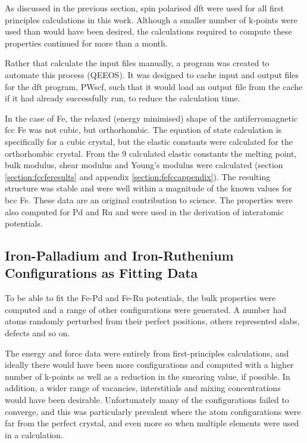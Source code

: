 As discussed in the previous section, spin polarised \acrshort{dft} were used for all first principles calculations in this work.  Although a smaller number of k-points were used than would have been desired, the calculations required to compute these properties continued for more than a month.

Rather that calculate the input files manually, a program was created to automate this process (QEEOS).  It was designed to cache input and output files for the \acrshort{dft} program, PWscf, such that it would load an output file from the cache if it had already successfully run, to reduce the calculation time.

In the case of Fe, the relaxed (energy minimised) shape of the antiferromagnetic \acrshort{fcc} Fe was not cubic, but orthorhombic.  The equation of state calculation is specifically for a cubic crystal, but the elastic constants were calculated for the orthorhombic crystal.  From the 9 calculated elastic constants the melting point, bulk modulus, shear modulus and Young's modulus were calculated (section \ref{section:fccferesults} and appendix \ref{section:fefccappendix}).  The resulting structure was stable and were well within a magnitude of the known values for \acrshort{bcc} Fe.  These data are an original contribution to science.  The properties were also computed for Pd and Ru and were used in the derivation of interatomic potentials.


\subsection{Iron-Palladium and Iron-Ruthenium Configurations as Fitting Data}

To be able to fit the Fe-Pd and Fe-Ru potentials, the bulk properties were computed and a range of other configurations were generated.  A number had atoms randomly perturbed from their perfect positions, others represented slabs, defects and so on.

The energy and force data were entirely from first-principles calculations, and ideally there would have been more configurations and computed with a higher number of k-points as well as a reduction in the smearing value, if possible.  In addition, a wider range of vacancies, interstitials and mixing concentrations would have been desirable.  Unfortunately many of the configurations failed to converge, and this was particularly prevalent where the atom configurations were far from the perfect crystal, and even more so when multiple elements were used in a calculation.

